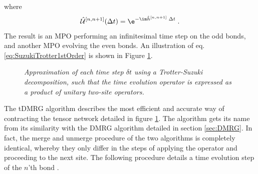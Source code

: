 where
\begin{equation}
	\hat{\mathcal{U}}^{[n,n+1]} (\Delta t) = \e^{- \im \hat{h}^{[n , n+1]} \; \Delta t } \; .
\end{equation}
The result is an MPO performing an infinitesimal time step on the odd bonds, and another MPO evolving the even bonds. An illustration of eq. \eqref{eq:SuzukiTrotter1stOrder} is shown in Figure \ref{fig:oddevenops}.
\begin{figure}[h!]
	\centering
	
	\caption{\textit{Approximation of each time step $\delta t$ using a Trotter-Suzuki decomposition, such that the time evolution operator is expressed as a product of unitary two-site operators.}}
	\label{fig:oddevenops}
\end{figure}
The tDMRG algorithm describes the most efficient and accurate way of contracting the tensor network detailed in figure \ref{fig:oddevenops}. The algorithm gets its name from its similarity with the DMRG algorithm detailed in section \ref{sec:DMRG}. In fact, the merge and unmerge procedure of the two algorithms is completely identical, whereby they only differ in the steps of applying the operator and proceeding to the next site. The following procedure details a time evolution step of the $n$'th bond \cite{schollwock}.


